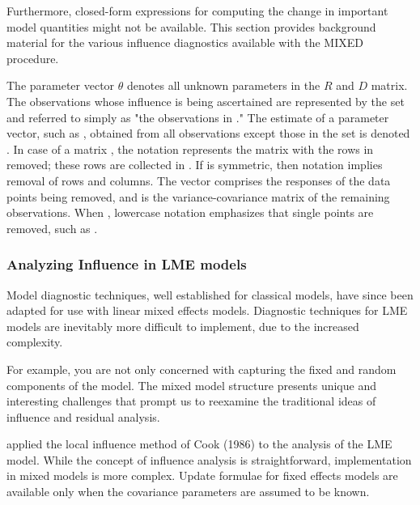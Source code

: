\documentclass[12pt, a4paper]{report}
\theoremstyle{plain}
\theoremstyle{definition}
\theoremstyle{remark}
\begin{document}
	
	Furthermore, closed-form expressions for computing the change in important model quantities might not be available.
	This section provides background material for the various influence diagnostics available with the MIXED procedure.
	
	The parameter vector $\theta$ denotes all unknown parameters in the  $R$ and $D$  matrix.
	The observations whose influence is being ascertained are represented by the set  and referred to simply as "the observations in ." The estimate of a parameter vector, such as , obtained from all observations except those in the set  is denoted . In case of a matrix , the notation  represents the matrix with the rows in  removed; these rows are collected in .
	If  is symmetric, then notation  implies removal of rows and columns. The vector  comprises the responses of the data points being removed, and  is the variance-covariance matrix of the remaining observations. When , lowercase notation emphasizes that single points are removed, such as .
	
	
	
	\subsubsection{Analyzing Influence in LME models}
	
	Model diagnostic techniques, well established for classical models, have since been adapted for use with linear mixed effects models. Diagnostic techniques for LME models are inevitably more difficult to implement, due to the increased complexity.
	

	
 For example, you are not only concerned with capturing the fixed and random components of the model. The mixed model structure presents unique and interesting challenges that prompt us to reexamine the traditional ideas of influence and residual analysis.

		\citet{Beckman} applied the local influence method of Cook (1986) to the analysis of the LME model.
		While the concept of influence analysis is straightforward, implementation in mixed models is more complex. Update formulae for fixed effects models are available only when the covariance parameters are assumed to be known.


	
	
\end{document}
